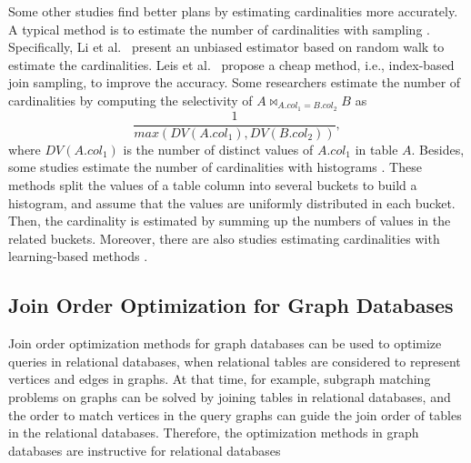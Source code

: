 Some other studies find better plans by estimating cardinalities more accurately.
A typical method is to estimate the number of cardinalities with sampling \cite{index-based-join-sampling,ripple-join,wanderjoin,index-based-join-sampling}.
Specifically, Li et al.~\cite{wanderjoin} present an unbiased estimator based on random walk to estimate the cardinalities.
Leis et al.~\cite{index-based-join-sampling} propose a cheap method, i.e., index-based join sampling, to improve the accuracy.
Some researchers \cite{selinger,postgres-row-estimation} estimate the number of cardinalities by computing the selectivity of $A \bowtie_{A.col_1 = B.col_2} B$ as 
\begin{equation*}
    \frac{1}{max(DV(A.col_1), DV(B.col_2))},
\end{equation*}
where $DV(A.col_1)$ is the number of distinct values of $A.col_1$ in table $A$.
Besides, some studies estimate the number of cardinalities with histograms \cite{histogram,postgres-row-estimation}.
These methods split the values of a table column into several buckets to build a histogram, and assume that the values are uniformly distributed in each bucket.
Then, the cardinality is estimated by summing up the numbers of values in the related buckets.
Moreover, there are also studies estimating cardinalities with learning-based methods \cite{learning-based-estimation-1,learning-based-estimation-2,learning-based-estimation-3,learning-based-estimation-4}.


\subsection{Join Order Optimization for Graph Databases}
\label{sec:related-work:gopt}
Join order optimization methods for graph databases can be used to optimize queries in relational databases, when relational tables are considered to represent vertices and edges in graphs.
At that time, for example, subgraph matching problems on graphs can be solved by joining tables in relational databases, and the order to match vertices in the query graphs can guide the join order of tables in the relational databases.
Therefore, the optimization methods in graph databases are instructive for relational databases


